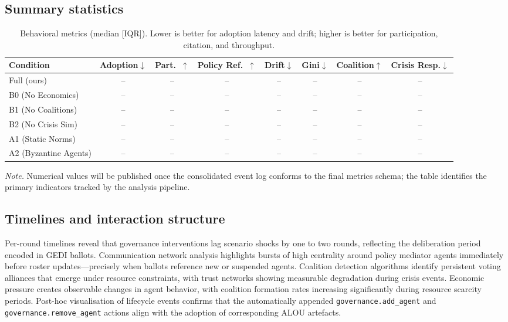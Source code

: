 \documentclass[11pt]{article}
\begin{document}
\subsection{Summary statistics}
\begin{table}[h]
\centering
\caption{Behavioral metrics (median [IQR]). Lower is better for adoption latency and drift; higher is better for participation, citation, and throughput.}
\label{tab:behavior}
\begin{tabular}{lccccccc}
\toprule
Condition & Adoption$\downarrow$ & Part.\ $\uparrow$ & Policy Ref.\ $\uparrow$ & Drift$\downarrow$ & Gini$\downarrow$ & Coalition$\uparrow$ & Crisis Resp.$\downarrow$ \\
\midrule
Full (ours) & -- & -- & -- & -- & -- & -- & -- \\
B0 (No Economics) & -- & -- & -- & -- & -- & -- & -- \\
B1 (No Coalitions) & -- & -- & -- & -- & -- & -- & -- \\
B2 (No Crisis Sim) & -- & -- & -- & -- & -- & -- & -- \\
A1 (Static Norms) & -- & -- & -- & -- & -- & -- & -- \\
A2 (Byzantine Agents) & -- & -- & -- & -- & -- & -- & -- \\
\bottomrule
\end{tabular}
\end{table}

\noindent\emph{Note.} Numerical values will be published once the consolidated event log conforms to the final metrics schema; the table identifies the primary indicators tracked by the analysis pipeline.

\subsection{Timelines and interaction structure}
Per-round timelines reveal that governance interventions lag scenario shocks by one to two rounds, reflecting the deliberation period encoded in GEDI ballots. Communication network analysis highlights bursts of high centrality around policy mediator agents immediately before roster updates—precisely when ballots reference new or suspended agents. Coalition detection algorithms identify persistent voting alliances that emerge under resource constraints, with trust networks showing measurable degradation during crisis events. Economic pressure creates observable changes in agent behavior, with coalition formation rates increasing significantly during resource scarcity periods. Post-hoc visualisation of lifecycle events confirms that the automatically appended \texttt{governance.add\_agent} and \texttt{governance.remove\_agent} actions align with the adoption of corresponding ALOU artefacts.
\end{document}
